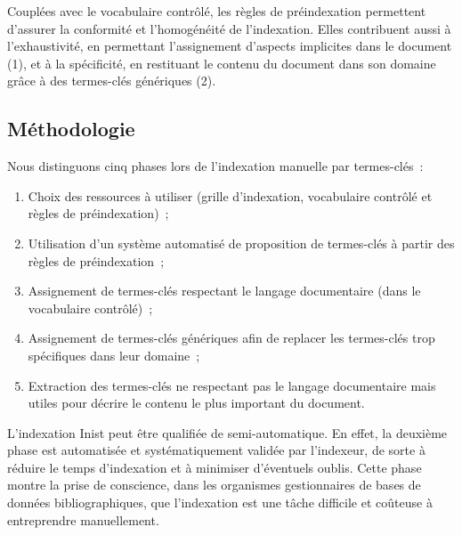         Couplées avec le vocabulaire contrôlé, les règles de préindexation
        permettent d'assurer la conformité et l'homogénéité de l'indexation.
        Elles contribuent aussi à l'exhaustivité, en permettant l'assignement
        d'aspects implicites dans le document (1), et à la spécificité, en
        restituant le contenu du document dans son domaine grâce à des
        termes-clés génériques (2).

    \subsection{Méthodologie}
    \label{subsec:main-domain_specific_keyphrase_annotation-manual_keyphrase_annotation-methodology}
      Nous distinguons cinq phases lors de l'indexation manuelle par
      termes-clés~:
      \begin{enumerate}
        \item{Choix des ressources à utiliser (grille d'indexation, vocabulaire
              contrôlé et règles de préindexation)~;}
        \item{Utilisation d'un système automatisé de proposition de termes-clés
              à partir des règles de préindexation~;}
        \item{Assignement de termes-clés respectant le langage documentaire
              (dans le vocabulaire contrôlé)~;}
        \item{Assignement de termes-clés génériques afin de replacer les
              termes-clés trop spécifiques dans leur domaine~;}
        \item{Extraction des termes-clés ne respectant pas le langage
              documentaire mais utiles pour décrire le contenu le plus important
              du document.}
      \end{enumerate}

      L'indexation Inist peut être qualifiée de semi-automatique. En effet, la
      deuxième phase est automatisée et systématiquement validée par l'indexeur,
      de sorte à réduire le temps d'indexation et à minimiser d'éventuels
      oublis. Cette phase montre la prise de conscience, dans les organismes
      gestionnaires de bases de données bibliographiques, que l'indexation est
      une tâche difficile et coûteuse à entreprendre manuellement.

